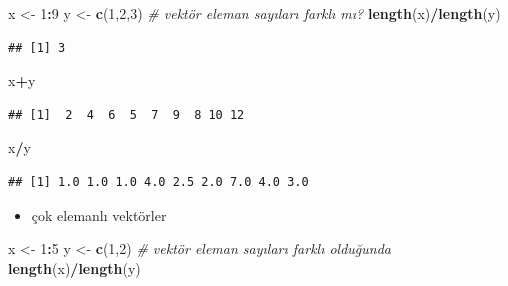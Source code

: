 \documentclass[
  oneside]{book}
\newenvironment{Shaded}{\begin{snugshade}}{\end{snugshade}}
\newcommand{\CommentTok}[1]{\textcolor[rgb]{0.56,0.35,0.01}{\textit{#1}}}
\newcommand{\DecValTok}[1]{\textcolor[rgb]{0.00,0.00,0.81}{#1}}
\newcommand{\FunctionTok}[1]{\textcolor[rgb]{0.13,0.29,0.53}{\textbf{#1}}}
\newcommand{\NormalTok}[1]{#1}
\newcommand{\OtherTok}[1]{\textcolor[rgb]{0.56,0.35,0.01}{#1}}
\newcommand{\SpecialCharTok}[1]{\textcolor[rgb]{0.81,0.36,0.00}{\textbf{#1}}}
\providecommand{\tightlist}{%
  \setlength{\itemsep}{0pt}\setlength{\parskip}{0pt}}
\begin{document}
\begin{Shaded}
\begin{Highlighting}[]
\NormalTok{x }\OtherTok{\textless{}{-}} \DecValTok{1}\SpecialCharTok{:}\DecValTok{9}
\NormalTok{y }\OtherTok{\textless{}{-}} \FunctionTok{c}\NormalTok{(}\DecValTok{1}\NormalTok{,}\DecValTok{2}\NormalTok{,}\DecValTok{3}\NormalTok{)}
\CommentTok{\# vektör eleman sayıları farklı mı?}
\FunctionTok{length}\NormalTok{(x)}\SpecialCharTok{/}\FunctionTok{length}\NormalTok{(y)}
\end{Highlighting}
\end{Shaded}

\begin{verbatim}
## [1] 3
\end{verbatim}

\begin{Shaded}
\begin{Highlighting}[]
\NormalTok{x}\SpecialCharTok{+}\NormalTok{y}
\end{Highlighting}
\end{Shaded}

\begin{verbatim}
## [1]  2  4  6  5  7  9  8 10 12
\end{verbatim}

\begin{Shaded}
\begin{Highlighting}[]
\NormalTok{x}\SpecialCharTok{/}\NormalTok{y}
\end{Highlighting}
\end{Shaded}

\begin{verbatim}
## [1] 1.0 1.0 1.0 4.0 2.5 2.0 7.0 4.0 3.0
\end{verbatim}

\begin{itemize}
\tightlist
\item
  çok elemanlı vektörler
\end{itemize}

\begin{Shaded}
\begin{Highlighting}[]
\NormalTok{x }\OtherTok{\textless{}{-}} \DecValTok{1}\SpecialCharTok{:}\DecValTok{5}
\NormalTok{y }\OtherTok{\textless{}{-}} \FunctionTok{c}\NormalTok{(}\DecValTok{1}\NormalTok{,}\DecValTok{2}\NormalTok{)}
\CommentTok{\# vektör eleman sayıları farklı olduğunda}
\FunctionTok{length}\NormalTok{(x)}\SpecialCharTok{/}\FunctionTok{length}\NormalTok{(y)}
\end{Highlighting}
\end{Shaded}
\end{document}
